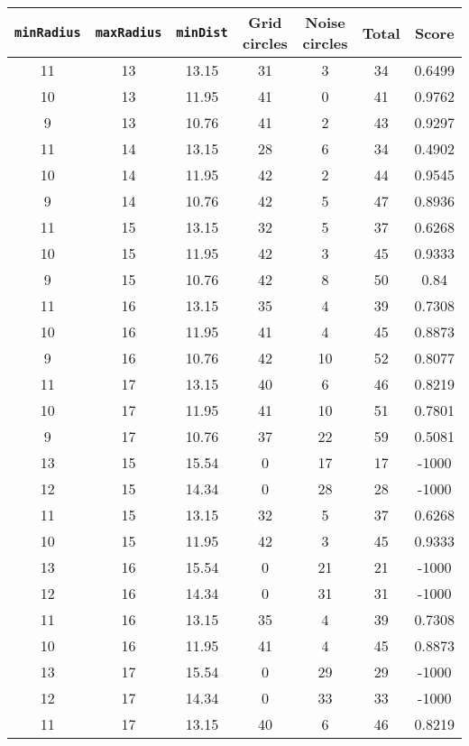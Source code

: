 \documentclass[letterpaper, 12pt]{article}
\begin{document}
\begin{longtable}{|c|c|c|c|c|c|c|}
\hline
\textbf{\texttt{minRadius}} & \textbf{\texttt{maxRadius}} & \textbf{\texttt{minDist}} & \textbf{Grid circles} & \textbf{Noise circles} & \textbf{Total} & \textbf{Score} \\
\hline
11 & 13 & 13.15 & 31 & 3 & 34 & 0.6499 \\
\hline
10 & 13 & 11.95 & 41 & 0 & 41 & 0.9762 \\
\hline
9 & 13 & 10.76 & 41 & 2 & 43 & 0.9297 \\
\hline
11 & 14 & 13.15 & 28 & 6 & 34 & 0.4902 \\
\hline
10 & 14 & 11.95 & 42 & 2 & 44 & 0.9545 \\
\hline
9 & 14 & 10.76 & 42 & 5 & 47 & 0.8936 \\
\hline
11 & 15 & 13.15 & 32 & 5 & 37 & 0.6268 \\
\hline
10 & 15 & 11.95 & 42 & 3 & 45 & 0.9333 \\
\hline
9 & 15 & 10.76 & 42 & 8 & 50 & 0.84 \\
\hline
11 & 16 & 13.15 & 35 & 4 & 39 & 0.7308 \\
\hline
10 & 16 & 11.95 & 41 & 4 & 45 & 0.8873 \\
\hline
9 & 16 & 10.76 & 42 & 10 & 52 & 0.8077 \\
\hline
11 & 17 & 13.15 & 40 & 6 & 46 & 0.8219 \\
\hline
10 & 17 & 11.95 & 41 & 10 & 51 & 0.7801 \\
\hline
9 & 17 & 10.76 & 37 & 22 & 59 & 0.5081 \\
\hline
13 & 15 & 15.54 & 0 & 17 & 17 & -1000 \\
\hline
12 & 15 & 14.34 & 0 & 28 & 28 & -1000 \\
\hline
11 & 15 & 13.15 & 32 & 5 & 37 & 0.6268 \\
\hline
10 & 15 & 11.95 & 42 & 3 & 45 & 0.9333 \\
\hline
13 & 16 & 15.54 & 0 & 21 & 21 & -1000 \\
\hline
12 & 16 & 14.34 & 0 & 31 & 31 & -1000 \\
\hline
11 & 16 & 13.15 & 35 & 4 & 39 & 0.7308 \\
\hline
10 & 16 & 11.95 & 41 & 4 & 45 & 0.8873 \\
\hline
13 & 17 & 15.54 & 0 & 29 & 29 & -1000 \\
\hline
12 & 17 & 14.34 & 0 & 33 & 33 & -1000 \\
\hline
11 & 17 & 13.15 & 40 & 6 & 46 & 0.8219 \\
\hline

\end{longtable}
\end{document}
